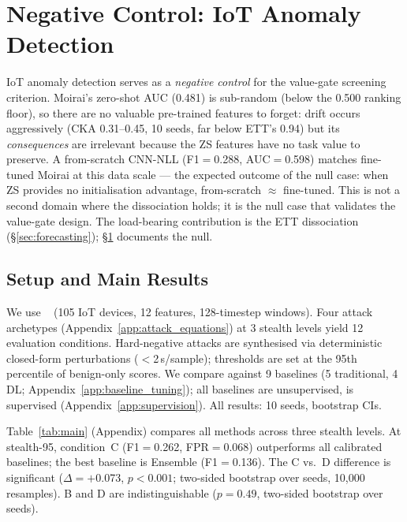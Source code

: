 \section{Negative Control: IoT Anomaly Detection}
\label{sec:iot}

IoT anomaly detection serves as a \emph{negative control} for the
value-gate screening criterion.  Moirai's zero-shot AUC (0.481) is sub-random
(below the 0.500 ranking floor), so there are no valuable pre-trained
features to forget: drift occurs aggressively (CKA 0.31--0.45, 10 seeds,
far below ETT's 0.94) but its \emph{consequences} are irrelevant
because the ZS features have no task value to preserve.  A from-scratch
CNN-NLL (F1$=$0.288, AUC$=$0.598) matches fine-tuned Moirai at this
data scale --- the expected outcome of the null case: when ZS provides
no initialisation advantage, from-scratch $\approx$ fine-tuned.
This is not a second domain where the dissociation holds; it is the
null case that validates the value-gate design.
The load-bearing contribution is the ETT dissociation
(\S\ref{sec:forecasting}); \S\ref{sec:iot} documents the null.

\subsection{Setup and Main Results}
\label{sec:experiments:setup}

We use \dataset{}~\cite{neto2023ciciot} (105 IoT devices, 12 features,
128-timestep windows).  Four attack archetypes
(Appendix~\ref{app:attack_equations}) at 3 stealth levels yield 12
evaluation conditions.  Hard-negative attacks are synthesised via
deterministic closed-form perturbations ($<$2\,s/sample); thresholds
are set at the 95th percentile of benign-only scores.
We compare against 9 baselines (5 traditional, 4 DL;
Appendix~\ref{app:baseline_tuning}); all baselines are unsupervised,
\ours{} is supervised (Appendix~\ref{app:supervision}).
All results: 10 seeds, bootstrap CIs.

Table~\ref{tab:main} (Appendix) compares all methods across three stealth levels.
At stealth-95, \ours{} condition~C (F1$=$0.262, FPR$=$0.068) outperforms all
calibrated baselines; the best baseline is Ensemble (F1$=$0.136).
The C vs.\ D difference is significant
($\Delta{=}+$0.073, $p{<}0.001$; two-sided bootstrap over seeds,
10{,}000 resamples).
B and D are indistinguishable ($p{=}0.49$, two-sided bootstrap over seeds).

